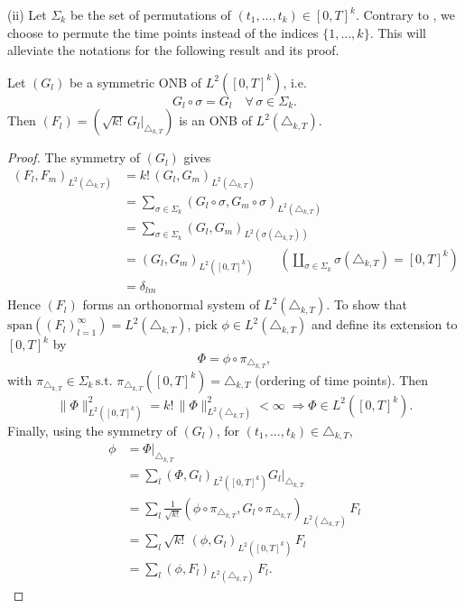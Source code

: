 (ii)  
Let $\Sigma_k$ be the set of permutations of  $(t_1,...,t_k) \in [0,T]^{k}$. %
Contrary to \cite{Oksendal}, we choose to permute the time points instead of the indices $\{1,...,k\}$. This will alleviate the notations for the following result and its proof. %


\begin{proposition}
Let  $(G_{l})$ be a symmetric ONB of $L^2([0,T]^k)$, i.e. 
$$G_{l} \circ \sigma = G_l\quad \forall\, \sigma \in \Sigma_k.$$%
Then 
$ (F_{l}) =\left(\sqrt{k!} \, G_l\big |_{\triangle_{k,T}}\right)$
is an ONB of $L^2(\triangle_{k,T})$.
\end{proposition}
\begin{proof}
The symmetry of $(G_l)$ gives
\begin{align*}
 (F_{l}, F_{m})_{L^2(\triangle_{k,T})} &= k!\, (G_{l}, G_{m})_{L^2(\triangle_{k,T})}\\
 &=\sum_{\sigma \in \Sigma_k} (G_{l}\circ \sigma, G_{m}\circ \sigma)_{L^2(\triangle_{k,T})} \\
 &= \sum_{\sigma \in \Sigma_k} (G_{l}, G_{m})_{L^2(\sigma(\triangle_{k,T}))}\\
 &=  (G_{l}, G_{m})_{L^2([0,T]^k)} \qquad \left( \coprod_{\sigma \in \Sigma_k} \sigma(\triangle_{k,T}) = [0,T]^k \right)\\
 &= \delta_{lm}
\end{align*}
Hence $(F_{l})$ forms  an orthonormal system of $L^2(\triangle_{k,T})$. 
To show that $\text{span}((F_l)_{l=1}^{\infty}) = L^2(\triangle_{k,T})$, pick $\phi \in L^2(\triangle_{k,T})$ and define its extension to $[0,T]^k$ by
$$\Phi = \phi \circ \pi_{\triangle_{k,T}},  $$
with $\pi_{\triangle_{k,T}} \in \Sigma_k \, \text{s.t. } \pi_{\triangle_{k,T}}([0,T]^k) = \triangle_{k,T}$ (ordering of time points). Then $$\lVert \Phi \rVert^2_{L^2([0,T]^k)} = k! \,  \lVert \Phi \rVert^2_{L^2(\triangle_{k,T})} < \infty\; \Longrightarrow \Phi \in L^2([0,T]^k).$$
Finally, using the symmetry of $(G_l)$,  for $(t_1,...,t_k) \in \triangle_{k,T}$, 
\begin{align*}
    \phi &= \Phi\big |_{\triangle_{k,T}}\\
    &= \sum_{l} (\Phi, G_l)_{{L^2([0,T]^k)}} G_l\big |_{\triangle_{k,T}} \\
    &= \sum_{l} \frac{1}{\sqrt{k!}} (\phi \circ \pi_{\triangle_{k,T}}, G_l \circ \pi_{\triangle_{k,T}} )_{{L^2(\triangle_{k,T})}}   \,  F_l\\
    &= \sum_{l} \sqrt{k!} \, (\phi, G_l)_{{L^2([0,T]^k)}}   \,  F_l\\
     &= \sum_{l} (\phi , F_l  )_{{L^2(\triangle_{k,T})}}  \,  F_l.
\end{align*}

\end{proof}
    
